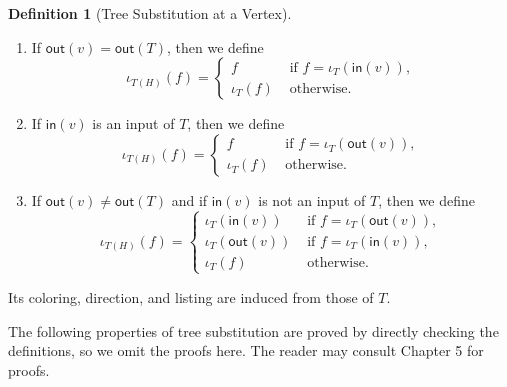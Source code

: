 \documentclass{amsbook}
\numberwithin{section}{chapter}
\numberwithin{subsection}{section}
\numberwithin{equation}{section}
\theoremstyle{plain}
\theoremstyle{definition}
\newtheorem{definition}[equation]{Definition}
\newcommand{\inp}{\mathsf{in}}
\newcommand{\out}{\mathsf{out}}
\begin{document}
\begin{definition}[Tree Substitution at a Vertex]
\begin{enumerate}
\begin{enumerate}
\item If $\out(v)=\out(T)$, then we define \[\iota_{T(H)}(f) =\begin{cases} f & \text{ if $f=\iota_T(\inp(v))$},\\ \iota_T(f) & \text{ otherwise}.\end{cases}\]
\item If $\inp(v)$ is an input of $T$, then we define \[\iota_{T(H)}(f)=\begin{cases} f & \text{ if $f=\iota_T(\out(v))$},\\ \iota_T(f) & \text{ otherwise}. \end{cases}\]
\item If $\out(v) \not= \out(T)$ and if $\inp(v)$ is not an input of $T$, then we define \[\iota_{T(H)}(f)=\begin{cases}\iota_T(\inp(v)) & \text{ if $f=\iota_T(\out(v))$},\\ \iota_T(\out(v)) & \text{ if $f=\iota_T(\inp(v))$},\\ \iota_T(f) & \text{ otherwise}.\end{cases}\]
\end{enumerate}
Its coloring, direction, and listing are induced from those of $T$.
\end{enumerate}\end{definition}

The following properties of tree substitution are proved by directly checking the definitions, so we omit the proofs here.  The reader may consult \cite{bluemonster} Chapter 5 for proofs.  
\end{document}
